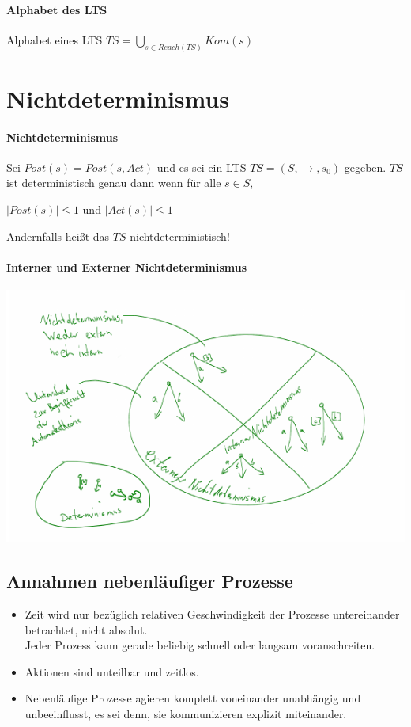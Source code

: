 \documentclass[a4paper,10pt, oneside]{book}
\begin{document}
\paragraph{Alphabet des LTS}
Alphabet eines LTS $TS = \bigcup\limits_{s \in Reach(TS)} Kom(s)$

\section{Nichtdeterminismus}
\paragraph{Nichtdeterminismus}
Sei $Post(s) = Post(s, Act)$ und es sei ein LTS $TS = (S, \rightarrow, s_0) $ gegeben. $TS$ ist deterministisch genau dann wenn für alle $s \in S$,

\begin{center}
$ |Post(s)| \leq 1 $ und $|Act(s)| \leq 1$
\end{center}

Andernfalls heißt das $TS$ nichtdeterministisch!

\paragraph{Interner und Externer Nichtdeterminismus}
\begin{flushleft}
\includegraphics[scale=1]{chart_nichtdeterministisch} 
\end{flushleft}

\subsection{Annahmen nebenläufiger Prozesse}
\begin{itemize}
 \item Zeit wird nur bezüglich relativen Geschwindigkeit der Prozesse untereinander betrachtet, nicht absolut.\\
 Jeder Prozess kann gerade beliebig schnell oder langsam voranschreiten.
 \item Aktionen sind unteilbar und zeitlos.
 \item Nebenläufige Prozesse agieren komplett voneinander unabhängig und unbeeinflusst, es sei denn, sie kommunizieren explizit miteinander.
\end{itemize}
\end{document}
